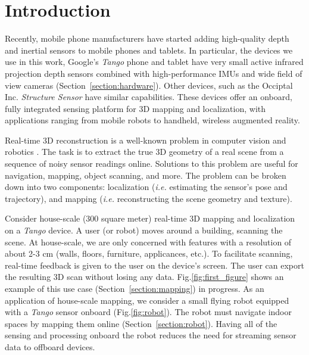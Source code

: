 \documentclass[conference]{IEEEtran}
\newcommand{\sref}[1]{Section~\ref{#1}}
\newcommand{\figref}[1]{Fig.\ref{#1}}
\newcommand{\ie}{\textit{i.e.}\xspace}
\newcommand{\Tango}{\textit{Tango}\xspace}
\begin{document}
\section{Introduction}
Recently, mobile phone manufacturers have started adding
high-quality depth and  inertial sensors to mobile phones and tablets. In
particular, the devices we use in this work, Google's \Tango \cite{Tango}
phone and tablet have very small active infrared projection depth sensors
combined with high-performance IMUs and wide field of view cameras
(\sref{section:hardware}). Other devices, such as the Occiptal Inc.
\textit{Structure Sensor} \cite{StructureSensor} have similar capabilities.
These devices offer an onboard, fully integrated sensing platform for 3D mapping
and localization, with applications ranging from mobile robots to handheld,
wireless augmented reality. 

Real-time 3D reconstruction is a well-known problem in computer vision and
robotics \cite{Hartley2004}. The task is to extract the true 3D geometry of a
real scene from a sequence of noisy sensor readings online. Solutions to this
problem are useful for navigation, mapping, object scanning, and more. The
problem can be broken down into two components: localization (\ie estimating
the sensor's pose and trajectory), and mapping (\ie reconstructing the scene
geometry and texture).

Consider house-scale (300 square meter) real-time 3D mapping and localization on
a \Tango device.  A user (or robot) moves around a building, scanning
the scene. At house-scale, we are only concerned with features with a resolution
of about 2-3 cm (walls, floors, furniture, applicances, etc.). To facilitate
scanning, real-time feedback is given to the user on the device's screen.  The
user can export the resulting 3D scan without losing any data.
\figref{fig:first_figure} shows an example of this use case (\sref{section:mapping})
in progress. As an application of house-scale mapping, we consider a small
flying robot equipped with a \Tango sensor onboard (\figref{fig:robot}). The
robot must navigate indoor spaces by mapping them online (\sref{section:robot}).
Having all of the sensing and processing onboard the robot reduces the need for
streaming sensor data to offboard devices.
\end{document}
